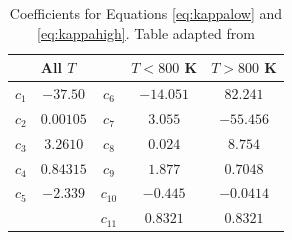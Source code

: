 \documentclass[11pt]{ucscthesisbs}
\begin{document}
\begin{table}[h]
\centering
\begin{tabular}{ccccc}
\multicolumn{1}{l}{}          & \multicolumn{1}{l}{All $T$}    & \multicolumn{1}{l}{}          & \multicolumn{1}{l}{$T < 800$ K} & \multicolumn{1}{l}{$T > 800$ K} \\ \hline
\multicolumn{1}{|c|}{$c_{1}$} & \multicolumn{1}{c|}{$-37.50$}  & \multicolumn{1}{c|}{$c_{6}$}  & \multicolumn{1}{c|}{$-14.051$}  & \multicolumn{1}{c|}{$82.241$}   \\ \hline
\multicolumn{1}{|c|}{$c_{2}$} & \multicolumn{1}{c|}{$0.00105$} & \multicolumn{1}{c|}{$c_{7}$}  & \multicolumn{1}{c|}{$3.055$}    & \multicolumn{1}{c|}{$-55.456$}  \\ \hline
\multicolumn{1}{|c|}{$c_{3}$} & \multicolumn{1}{c|}{$3.2610$}  & \multicolumn{1}{c|}{$c_{8}$}  & \multicolumn{1}{c|}{$0.024$}    & \multicolumn{1}{c|}{$8.754$}    \\ \hline
\multicolumn{1}{|c|}{$c_{4}$} & \multicolumn{1}{c|}{$0.84315$} & \multicolumn{1}{c|}{$c_{9}$}  & \multicolumn{1}{c|}{$1.877$}    & \multicolumn{1}{c|}{$0.7048$}   \\ \hline
\multicolumn{1}{|c|}{$c_{5}$} & \multicolumn{1}{c|}{$-2.339$}  & \multicolumn{1}{c|}{$c_{10}$} & \multicolumn{1}{c|}{$-0.445$}   & \multicolumn{1}{c|}{$-0.0414$}  \\ \hline
\multicolumn{1}{|c|}{}        & \multicolumn{1}{c|}{}          & \multicolumn{1}{c|}{$c_{11}$} & \multicolumn{1}{c|}{$0.8321$}   & \multicolumn{1}{c|}{$0.8321$}   \\ \hline
\end{tabular}
\caption{Coefficients for Equations \ref{eq:kappalow} and \ref{eq:kappahigh}. Table adapted from \citep{2013ApJ...775...10V}}
\label{tab:kappa_tab}
\end{table}
\end{document}
